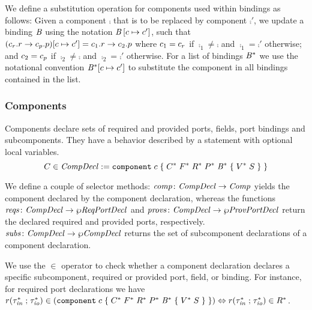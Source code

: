 \documentclass[a4paper,10pt,english]{article}
\begin{document}
We define a substitution operation for components used within bindings as follows: Given a component $\comp$ that is to be
replaced by component $\comp'$, we update a binding $\mathit{B}$ using the notation $\mathit{B}\left[c \mapsto
c'\right]$, such that
$(c_r\mathtt{.}r \; \mathtt{\rightarrow} \; c_p\mathtt{.}p)[c
\mapsto c'] = c_1\mathtt{.}r \; \mathtt{\rightarrow} \; c_2\mathtt{.}p$ where
$c_1 = c_r$ if $\comp_1 \neq \comp$ and $\comp_1 = \comp'$ otherwise; and $c_2 = c_p$ if $\comp_2
\neq \comp$ and $\comp_2 = \comp'$ otherwise.
For a list of bindings $\mathit{B}^*$ we use the notational convention
$\mathit{B}^*[c \mapsto c']$ to substitute the component in all bindings contained in the list.

\subsubsection{Components}
Components declare sets of required and provided ports, fields, port bindings and subcomponents. They have a behavior described by
a statement with optional local variables.
\begin{equation*}
	C \in \mathit{CompDecl} :=  
		\texttt{component} \; c \; \mathtt{\{} \; C^* \; F^* \; R^* \; P^* \; \mathit{B}^* \; \mathtt{\{} \; V^* \; S \; \mathtt{\}} \; \mathtt{\}}
\end{equation*}

We define a couple of selector methods: $\mathit{comp} \colon \mathit{CompDecl} \rightarrow \mathit{Comp}$ yields the component declared by the
component declaration, whereas the functions $\mathit{reqs} \colon \mathit{CompDecl} \rightarrow \wp \mathit{ReqPortDecl}$ and $\mathit{provs} \colon
\mathit{CompDecl} \rightarrow \wp \mathit{ProvPortDecl}$ return the declared required and provided ports, respectively. $\mathit{subs} \colon \mathit{CompDecl} \rightarrow
\wp \mathit{CompDecl}$ returns the set of subcomponent declarations of a component declaration.


We use the $\in$ operator to check whether a component declaration declares a specific subcomponent, required or provided port,
field, or binding.
For instance, for required port declarations we have
$r \mathtt{(} \tau_\mathit{in}^* \; \mathtt{;} \; \tau_\mathit{io}^* \mathtt{)} \in
(\texttt{component} \; c \; \mathtt{\{} \; C^* \; F^* \; R^* \; P^* \; \mathit{B}^* \; \mathtt{\{} \; V^* \; S \; \mathtt{\}} \; \mathtt{\}})
\Leftrightarrow r \mathtt{(} \tau_\mathit{in}^* \; \mathtt{;} \; \tau_\mathit{io}^* \mathtt{)} \in R^*$.
\end{document}
